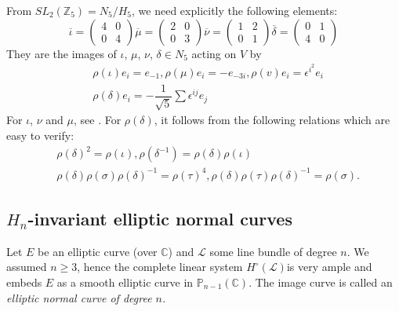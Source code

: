 From $SL_{2}(\mathbb{Z}_{5})=N_{5}/H_{5}$, we need explicitly the
following elements:
$$
\overline{\iota}=
\begin{pmatrix}
4 & 0\\
0 & 4
\end{pmatrix}
\overline{\mu}=
\begin{pmatrix}
2 & 0\\
0 & 3
\end{pmatrix}
\overline{\nu}=
\begin{pmatrix}
1 & 2\\
0 & 1
\end{pmatrix}
\overline{\delta}=
\begin{pmatrix}
0 & 1\\
4 & 0
\end{pmatrix}
$$
They are the images of $\iota$, $\mu$, $\nu$, $\delta\in N_{5}$ acting
on $V$ by
\begin{align*}
& \rho(\iota)e_{i}=e_{-1},\rho(\mu)e_{i}=-e_{-3i},\rho(v)e_{i}=\epsilon^{i^{2}}e_{i}\\
& \rho(\delta)e_{i}=-\dfrac{1}{\sqrt{5}}\sum \epsilon^{ij}e_{j}
\end{align*}
For $\iota$, $\nu$ and $\mu$, see \cite[p.66/67]{chap2-key6}. For
$\rho(\delta)$, it follows from the following relations which are easy
to verify:
\begin{align*}
& \rho(\delta)^{2}=\rho(\iota),\rho(\delta^{-1})=\rho(\delta)\rho(\iota)\\
& \rho(\delta)\rho(\sigma)\rho(\delta)^{-1}=\rho(\tau)^{4},\rho(\delta)\rho(\tau)\rho(\delta)^{-1}=\rho(\sigma). 
\end{align*}

\subsection{\texorpdfstring{$H_{n}$}{Hn}-invariant elliptic normal
curves}\label{chap2-sec3.2}

Let $E$ be an elliptic curve (over $\mathbb{C}$) and $\mathscr{L}$
some line bundle of degree $n$. We assumed $n\geq 3$, hence the
complete linear system $H^{\circ}(\mathscr{L})$\pageoriginale is very
ample and embeds $E$ as a smooth elliptic curve in
$\mathbb{P}_{n-1}(\mathbb{C})$. The image curve is called an {\em
elliptic normal curve of degree $n$.}

